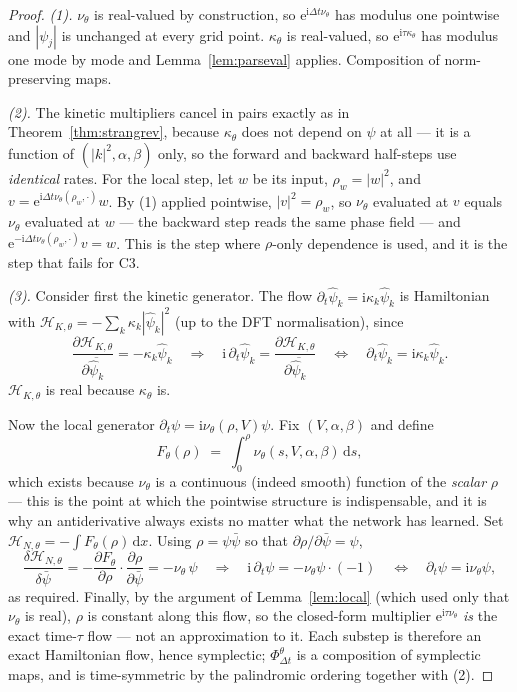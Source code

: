 \documentclass[11pt,a4paper]{article}
\theoremstyle{plain}
\theoremstyle{definition}
\theoremstyle{remark}
\newcommand{\iu}{\mathrm{i}}
\newcommand{\eu}{\mathrm{e}}
\newcommand{\dd}{\,\mathrm{d}}
\newcommand{\dt}{\Delta t}
\newcommand{\Flow}{\Phi}
\newcommand{\Ham}{\mathcal{H}}
\begin{document}
\begin{proof}\leavevmode

\emph{(1).} $\nu_\theta$ is real-valued by construction, so $\eu^{\iu\dt\nu_\theta}$ has
modulus one pointwise and $|\psi_j|$ is unchanged at every grid point. $\kappa_\theta$ is
real-valued, so $\eu^{\iu\tau\kappa_\theta}$ has modulus one mode by mode and
Lemma~\ref{lem:parseval} applies. Composition of norm-preserving maps.

\emph{(2).} The kinetic multipliers cancel in pairs exactly as in
Theorem~\ref{thm:strangrev}, because $\kappa_\theta$ does not depend on $\psi$ at all ---
it is a function of $(|k|^2,\alpha,\beta)$ only, so the forward and backward half-steps
use \emph{identical} rates. For the local step, let $w$ be its input, $\rho_w=|w|^2$, and
$v = \eu^{\iu\dt\nu_\theta(\rho_w,\cdot)}w$. By (1) applied pointwise, $|v|^2 = \rho_w$,
so $\nu_\theta$ evaluated at $v$ equals $\nu_\theta$ evaluated at $w$ --- the backward
step reads the same phase field --- and
$\eu^{-\iu\dt\nu_\theta(\rho_w,\cdot)}v = w$. This is the step where $\rho$-only
dependence is used, and it is the step that fails for C3.

\emph{(3).} Consider first the kinetic generator. The flow
$\partial_t\widehat\psi_k = \iu\kappa_k\widehat\psi_k$ is Hamiltonian with
$\Ham_{K,\theta} = -\sum_k \kappa_k|\widehat\psi_k|^2$ (up to the DFT normalisation),
since
\[
\frac{\partial \Ham_{K,\theta}}{\partial\overline{\widehat\psi_k}} = -\kappa_k\widehat\psi_k
\quad\Longrightarrow\quad
\iu\,\partial_t\widehat\psi_k = \frac{\partial\Ham_{K,\theta}}{\partial\overline{\widehat\psi_k}}
\quad\Longleftrightarrow\quad
\partial_t\widehat\psi_k = \iu\kappa_k\widehat\psi_k .
\]
$\Ham_{K,\theta}$ is real because $\kappa_\theta$ is.

Now the local generator $\partial_t\psi = \iu\nu_\theta(\rho,V)\psi$. Fix $(V,\alpha,\beta)$
and define
\[
F_\theta(\rho) \;=\; \int_0^{\rho}\nu_\theta(s,V,\alpha,\beta)\dd s,
\]
which exists because $\nu_\theta$ is a continuous (indeed smooth) function of the
\emph{scalar} $\rho$ --- this is the point at which the pointwise structure is
indispensable, and it is why an antiderivative always exists no matter what the network
has learned. Set $\Ham_{N,\theta} = -\int F_\theta(\rho)\dd x$. Using
$\rho = \psi\bar\psi$ so that $\partial\rho/\partial\bar\psi = \psi$,
\[
\frac{\delta \Ham_{N,\theta}}{\delta\bar\psi}
= -\frac{\partial F_\theta}{\partial\rho}\cdot\frac{\partial\rho}{\partial\bar\psi}
= -\nu_\theta\,\psi
\quad\Longrightarrow\quad
\iu\,\partial_t\psi = -\nu_\theta\psi \cdot(-1)
\quad\Longleftrightarrow\quad
\partial_t\psi = \iu\nu_\theta\psi ,
\]
as required. Finally, by the argument of Lemma~\ref{lem:local} (which used only that
$\nu_\theta$ is real), $\rho$ is constant along this flow, so the closed-form multiplier
$\eu^{\iu\tau\nu_\theta}$ \emph{is} the exact time-$\tau$ flow --- not an approximation to
it. Each substep is therefore an exact Hamiltonian flow, hence symplectic;
$\Flow^\theta_{\dt}$ is a composition of symplectic maps, and is time-symmetric by the
palindromic ordering together with (2).


\end{proof}
\end{document}
